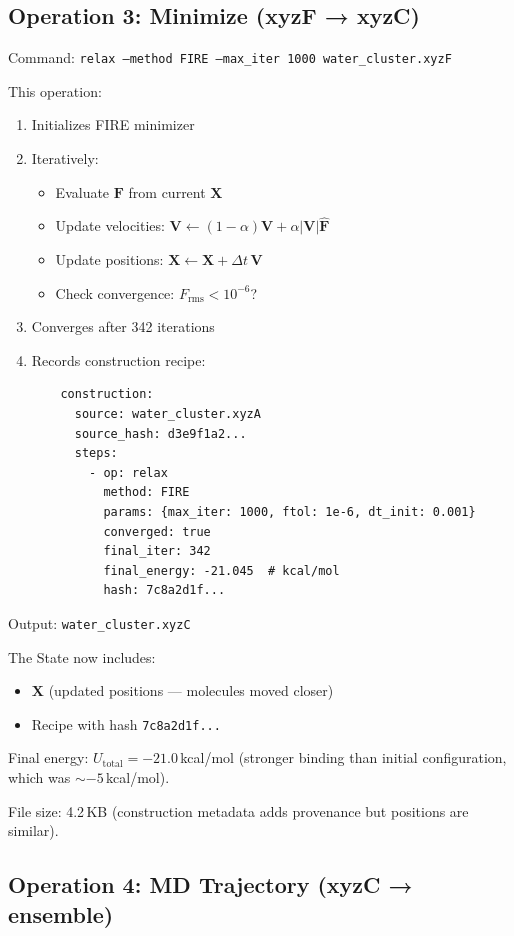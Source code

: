 \documentclass[11pt]{article}
\begin{document}
\subsection{Operation 3: Minimize (xyzF → xyzC)}

Command: \texttt{relax --method FIRE --max\_iter 1000 water\_cluster.xyzF}

This operation:
\begin{enumerate}
\item Initializes FIRE minimizer
\item Iteratively:
    \begin{itemize}
    \item Evaluate $\mathbf{F}$ from current $\mathbf{X}$
    \item Update velocities: $\mathbf{V} \gets (1-\alpha)\mathbf{V} + \alpha |\mathbf{V}| \hat{\mathbf{F}}$
    \item Update positions: $\mathbf{X} \gets \mathbf{X} + \Delta t \, \mathbf{V}$
    \item Check convergence: $F_{\text{rms}} < 10^{-6}$?
    \end{itemize}
\item Converges after 342 iterations
\item Records construction recipe:
    \begin{lstlisting}
    construction:
      source: water_cluster.xyzA
      source_hash: d3e9f1a2...
      steps:
        - op: relax
          method: FIRE
          params: {max_iter: 1000, ftol: 1e-6, dt_init: 0.001}
          converged: true
          final_iter: 342
          final_energy: -21.045  # kcal/mol
          hash: 7c8a2d1f...
    \end{lstlisting}
\end{enumerate}

Output: \texttt{water\_cluster.xyzC}

The State now includes:
\begin{itemize}
\item $\mathbf{X}$ (updated positions — molecules moved closer)
\item Recipe with hash \texttt{7c8a2d1f...}
\end{itemize}

Final energy: $U_{\text{total}} = -21.0$\,kcal/mol (stronger binding than initial configuration, which was $\sim -5$\,kcal/mol).

File size: 4.2\,KB (construction metadata adds provenance but positions are similar).

\subsection{Operation 4: MD Trajectory (xyzC → ensemble)}
\end{document}

